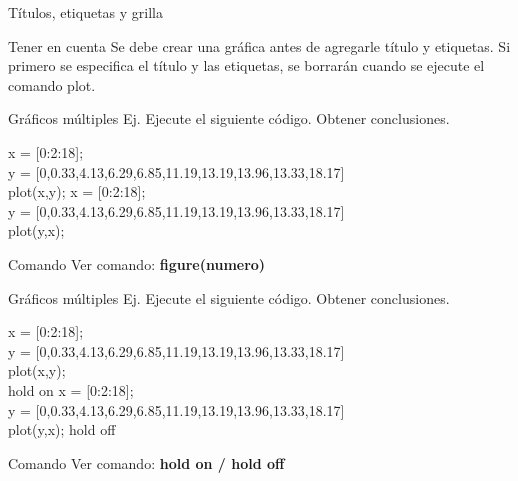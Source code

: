 \documentclass{bredelebeamer}
\begin{document}
\begin{frame}{Títulos, etiquetas y grilla}
\begin{alertblock}{Tener en cuenta}
Se debe crear una gráfica antes de agregarle título y etiquetas. Si primero se especifica el título y las etiquetas, se borrarán cuando se ejecute el comando plot.
\end{alertblock}
\end{frame}

\begin{frame}{Gráficos múltiples}
Ej. Ejecute el siguiente código. Obtener conclusiones.
\begin{center}
x = [0:2:18];\\
y = [0,0.33,4.13,6.29,6.85,11.19,13.19,13.96,13.33,18.17]\\
plot(x,y);
x = [0:2:18];\\
y = [0,0.33,4.13,6.29,6.85,11.19,13.19,13.96,13.33,18.17]\\
plot(y,x);
\end{center}
\begin{exampleblock}{Comando}
Ver comando: \textbf{figure(numero)}
\end{exampleblock}
\end{frame}

\begin{frame}{Gráficos múltiples}
Ej. Ejecute el siguiente código. Obtener conclusiones.
\begin{center}
x = [0:2:18];\\
y = [0,0.33,4.13,6.29,6.85,11.19,13.19,13.96,13.33,18.17]\\
plot(x,y); \\
hold on
x = [0:2:18];\\
y = [0,0.33,4.13,6.29,6.85,11.19,13.19,13.96,13.33,18.17]\\
plot(y,x);
hold off
\end{center}
\begin{exampleblock}{Comando}
Ver comando: \textbf{hold on / hold off}
\end{exampleblock}
\end{frame}
\end{document}
